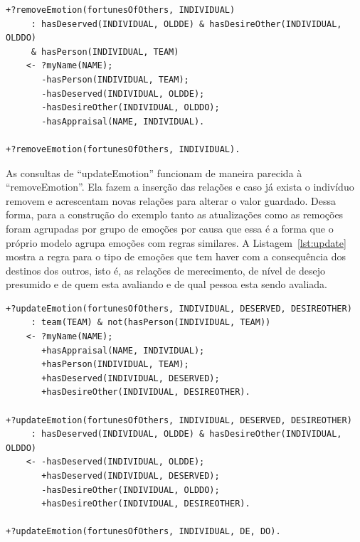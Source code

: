 \begin{center}
    \begin{minipage}{130mm}
	\lstset{linewidth=130mm}
	\begin{lstlisting}[frame=trbl,
caption=Amostra de remoção de emoção do tipo destino de outros,
label=lst:removeSample]
+?removeEmotion(fortunesOfOthers, INDIVIDUAL)
     : hasDeserved(INDIVIDUAL, OLDDE) & hasDesireOther(INDIVIDUAL, OLDDO)
     & hasPerson(INDIVIDUAL, TEAM)
    <- ?myName(NAME);
       -hasPerson(INDIVIDUAL, TEAM);
       -hasDeserved(INDIVIDUAL, OLDDE);
       -hasDesireOther(INDIVIDUAL, OLDDO);
       -hasAppraisal(NAME, INDIVIDUAL).

+?removeEmotion(fortunesOfOthers, INDIVIDUAL).
	\end{lstlisting}
    \end{minipage}
\end{center}

As consultas de ``updateEmotion'' funcionam de maneira parecida à
``removeEmotion''. Ela fazem a inserção das relações e caso já exista o
indivíduo removem e acrescentam novas relações para alterar o valor guardado.
Dessa forma, para a construção do exemplo tanto as atualizações como as
remoções foram agrupadas por grupo de emoções por causa que essa é a forma que
o próprio modelo \occ agrupa emoções com regras similares. A Listagem~\ref{lst:update}
mostra a regra para o tipo de emoções que tem haver com a consequência dos
destinos dos outros, isto é, as relações de merecimento, de nível de
desejo presumido e de quem esta avaliando e de qual pessoa esta sendo
avaliada.

\begin{center}
    \begin{minipage}{130mm}
	\lstset{linewidth=130mm}
	\begin{lstlisting}[frame=trbl,
caption=Amostra de código referente as atualizações de emoções do tipo destino de outros,
label=lst:update]
+?updateEmotion(fortunesOfOthers, INDIVIDUAL, DESERVED, DESIREOTHER)
     : team(TEAM) & not(hasPerson(INDIVIDUAL, TEAM))
    <- ?myName(NAME);
       +hasAppraisal(NAME, INDIVIDUAL);
       +hasPerson(INDIVIDUAL, TEAM);
       +hasDeserved(INDIVIDUAL, DESERVED);
       +hasDesireOther(INDIVIDUAL, DESIREOTHER).

+?updateEmotion(fortunesOfOthers, INDIVIDUAL, DESERVED, DESIREOTHER)
     : hasDeserved(INDIVIDUAL, OLDDE) & hasDesireOther(INDIVIDUAL, OLDDO)
    <- -hasDeserved(INDIVIDUAL, OLDDE);
       +hasDeserved(INDIVIDUAL, DESERVED);
       -hasDesireOther(INDIVIDUAL, OLDDO);
       +hasDesireOther(INDIVIDUAL, DESIREOTHER).

+?updateEmotion(fortunesOfOthers, INDIVIDUAL, DE, DO).
	\end{lstlisting}
    \end{minipage}
\end{center}

